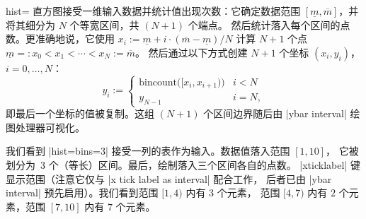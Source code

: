 \begin{plottype}[/pgfplots]{hist=\textcolor{black}{\normalfont{}}%
}
    直方图接受一维输入数据并统计值出现次数：它确定数据范围
    $[\underline m,\overline m]$，并将其细分为 $N$ 个等宽区间，共 $(N+1)$ 个端点。
    然后统计落入每个区间的点数。更准确地说，它使用
    $x_i := \underline m + i \cdot (\overline m - \underline m)/N$ 计算
    $N+1$ 个点 $\underline m =: x_0 < x_1 < \dotsb < x_N := \overline m$。
    然后通过以下方式创建 $N+1$ 个坐标 $(x_i, y_i)$，$i=0,\dotsc,N$：
        \[
            y_i :=
                \begin{cases}
                    \text{bincount}\bigl([x_i,x_{i+1})\bigr)        & i < N \\
                    y_{N-1}                                         & i = N,
                \end{cases}
        \]
    即最后一个坐标的值被复制。这组 $(N+1)$ 个区间边界随后由 |ybar interval|
    绘图处理器可视化。
\begin{codeexample}[]
\end{codeexample}
    我们看到 |hist={bins=3}| 接受一列的表作为输入。数据值落入范围 $[1,10]$，
    它被划分为~$3$ 个（等长）区间。最后，绘制落入三个区间各自的点数。
    |xticklabel| 键显示范围（注意它仅与 |x tick label as interval| 配合工作，
    后者已由 |ybar interval| 预先启用）。我们看到范围 $[1,4)$ 内有 $3$ 个元素，
    范围 $[4,7)$ 内有 $2$ 个元素，范围 $[7,10]$ 内有 $7$ 个元素。


\end{plottype}
